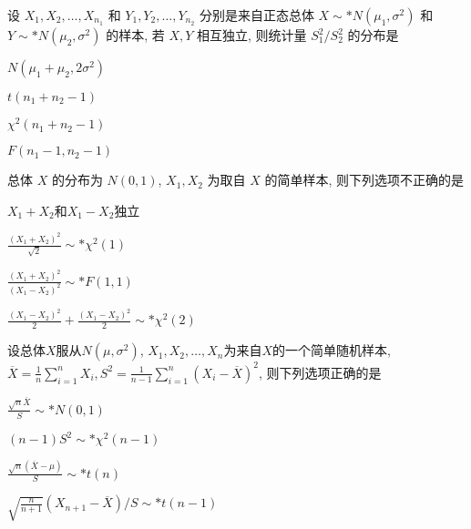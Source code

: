 \documentclass{exam-zh}
\begin{document}
\begin{question}
  设 $X_1, X_2, \dots, X_{n_1}$ 和 $Y_1, Y_2, \dots, Y_{n_2}$ 分别是来自正态总体 $X \sim* N(\mu_1, \sigma^2)$ 和 $Y \sim* N(\mu_2, \sigma^2)$ 的样本, 若 $X, Y$ 相互独立, 则统计量 $S_1^2 / S_2^2$ 的分布是
  \paren[D]

  \begin{choices}
    \item $N(\mu_1 + \mu_2, 2\sigma^2)$
    \item $t(n_1 + n_2 - 1)$
    \item $\chi^2(n_1 + n_2 - 1)$
    \item $F(n_1 - 1, n_2 - 1)$
  \end{choices}
\end{question}

\begin{question}
  总体 $X$ 的分布为 $N(0, 1)$, $X_1, X_2$ 为取自 $X$ 的简单样本, 则下列选项不正确的是 \paren[B]
  
  \begin{choices}
    \item $X_1 + X_2$和$X_1 - X_2$独立
    \item $\frac{(X_1 + X_2)^2}{\sqrt{2}} \sim* \chi^2(1)$
    \item $\frac{(X_1 + X_2)^2}{(X_1 - X_2)^2} \sim* F(1, 1)$
    \item $\frac{(X_1 - X_2)^2}{2} + \frac{(X_1 - X_2)^2}{2} \sim* \chi^2(2)$
  \end{choices}
\end{question}

\begin{question}
  设总体$X$服从$N(\mu, \sigma^2)$, $X_1,X_2, \dots, X_n$为来自$X$的一个简单随机样本, $\overline{X} = \frac{1}{n}\sum_{i=1}^{n}X_i, S^2 = \frac{1}{n-1}\sum_{i=1}^{n}(X_i - \overline{X})^2$, 则下列选项正确的是 \paren[D]
  
  \begin{choices}
    \item $\frac{\sqrt{n}\overline{X}}{S} \sim* N(0,1)$
    \item $(n-1)S^2 \sim* \chi^2(n-1)$
    \item $\frac{\sqrt{n}(\overline{X} - \mu)}{S} \sim* t(n)$
    \item $\sqrt{\frac{n}{n+1}}(X_{n+1} - \overline{X})/S \sim* t(n-1)$
  \end{choices}
\end{question}
\end{document}
